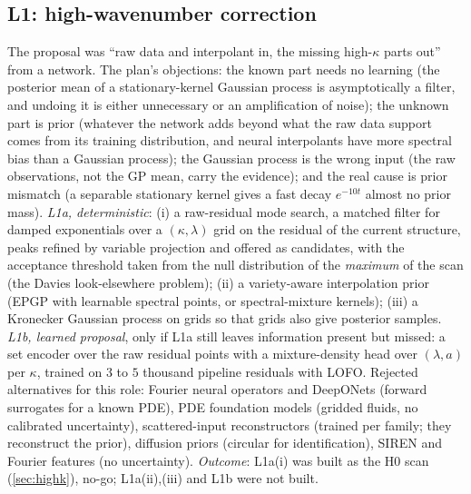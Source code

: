 \subsection{L1: high-wavenumber correction}
The proposal was ``raw data and interpolant in, the missing high-$\kappa$ parts out'' from a network. The plan's objections: the known part needs no learning (the posterior mean of a stationary-kernel Gaussian process is asymptotically a filter, and undoing it is either unnecessary or an amplification of noise);
the unknown part is prior (whatever the network adds beyond what the raw data support comes from its training distribution, and neural interpolants have more spectral bias than a Gaussian process); the Gaussian process is the wrong input (the raw observations, not the GP mean, carry the evidence); and the real cause is prior mismatch (a separable stationary kernel gives a fast decay $e^{-10t}$ almost no prior mass).
\emph{L1a, deterministic}: (i) a raw-residual mode search, a matched filter for damped exponentials over a $(\kappa,\lambda)$ grid on the residual of the current structure, peaks refined by variable projection and offered as candidates, with the acceptance threshold taken from the null distribution of the \emph{maximum} of the scan (the Davies look-elsewhere problem); (ii) a variety-aware interpolation prior (EPGP with learnable spectral points, or spectral-mixture kernels); (iii) a Kronecker Gaussian process on grids so that grids also give posterior samples.
\emph{L1b, learned proposal}, only if L1a still leaves information present but missed: a set encoder over the raw residual points with a mixture-density head over $(\lambda,a)$ per $\kappa$, trained on $3$ to $5$ thousand pipeline residuals with LOFO. Rejected alternatives for this role: Fourier neural operators and DeepONets (forward surrogates for a known PDE), PDE foundation models (gridded fluids, no calibrated uncertainty),
scattered-input reconstructors (trained per family; they reconstruct the prior), diffusion priors (circular for identification), SIREN and Fourier features (no uncertainty). \emph{Outcome}: L1a(i) was built as the H0 scan (\cref{sec:highk}), no-go; L1a(ii),(iii) and L1b were not built.

